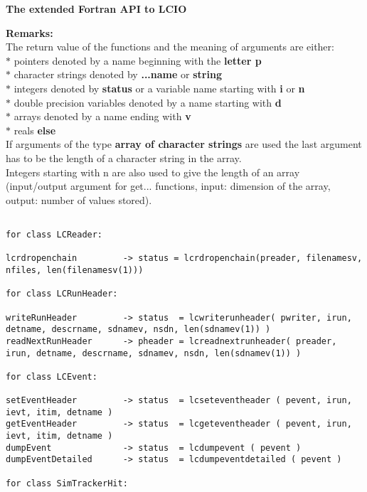 


\newpage
{\large\bf The extended Fortran API to LCIO} \\

\begin{scriptsize}

{\bf Remarks:} \\

The return value of the functions and the meaning of arguments are either: \\
$*$ pointers denoted by a name beginning with the {\bf letter p} \\
$*$ character strings denoted by {\bf ...name} or {\bf string} \\
$*$ integers  denoted by {\bf status} or a variable name starting with {\bf i} or {\bf n} \\
$*$ double precision variables denoted by a name starting with {\bf d} \\
$*$ arrays denoted by a name ending with {\bf v} \\
$*$ reals {\bf else} \\
If arguments of the type {\bf array of character strings} are used the last
argument has to be the length of a character string in the array.   \\
Integers starting with n are also used to give the length of an array 
(input/output argument for get... functions, input: dimension of the array, output: number of values stored).


\begin{verbatim}

for class LCReader:

lcrdropenchain         -> status = lcrdropenchain(preader, filenamesv, nfiles, len(filenamesv(1)))

for class LCRunHeader:

writeRunHeader         -> status  = lcwriterunheader( pwriter, irun, detname, descrname, sdnamev, nsdn, len(sdnamev(1)) )
readNextRunHeader      -> pheader = lcreadnextrunheader( preader, irun, detname, descrname, sdnamev, nsdn, len(sdnamev(1)) )

for class LCEvent:

setEventHeader         -> status  = lcseteventheader ( pevent, irun, ievt, itim, detname )
getEventHeader         -> status  = lcgeteventheader ( pevent, irun, ievt, itim, detname )
dumpEvent              -> status  = lcdumpevent ( pevent )
dumpEventDetailed      -> status  = lcdumpeventdetailed ( pevent )

for class SimTrackerHit:


\end{verbatim}
\end{scriptsize}
